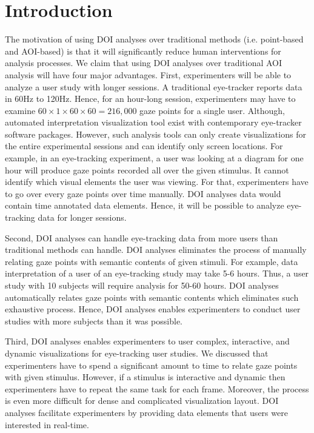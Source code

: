 \section{Introduction}
The motivation of using DOI analyses over traditional methods (i.e. point-based and AOI-based) is that it will significantly reduce human interventions for analysis processes. We claim that using DOI analyses over traditional AOI analysis will have four major advantages. First, experimenters will be able to analyze a user study with longer sessions. A traditional eye-tracker reports data in 60Hz to 120Hz. Hence, for an hour-long session, experimenters may have to examine $ 60 \times 1 \times 60 \times 60 =216,000$ gaze points for a single user. Although, automated interpretation visualization tool exist with contemporary eye-tracker software packages. However, such analysis tools can only create visualizations for the entire experimental sessions and can identify only screen locations. For example, in an eye-tracking experiment, a user was looking at a diagram for one hour will produce gaze points recorded all over the given stimulus. It cannot identify which visual elements the user was viewing. For that, experimenters have to go over every gaze points over time manually. DOI analyses data would contain time annotated data elements. Hence, it will be possible to analyze eye-tracking data for longer sessions.  

Second, DOI analyses can handle eye-tracking data from more users than traditional methods can handle. DOI analyses eliminates the process of manually relating gaze points with semantic contents of given stimuli.  For example, data interpretation of a user of an eye-tracking study may take 5-6 hours. Thus, a user study with 10 subjects will require analysis for 50-60 hours. DOI analyses automatically relates gaze points with semantic contents which eliminates such exhaustive process. Hence, DOI analyses enables experimenters to conduct user studies with more subjects than it was possible.

Third, DOI analyses enables experimenters to user complex, interactive, and dynamic visualizations for eye-tracking user studies. We discussed that experimenters have to spend a significant amount to time to relate gaze points with given stimulus. However, if a stimulus is interactive and dynamic then experimenters have to repeat the same task for each frame. Moreover, the process is even more difficult for dense and complicated visualization layout. DOI analyses facilitate experimenters by providing data elements that users were interested in real-time.

